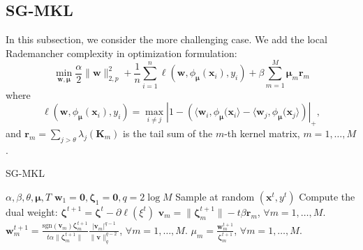 \documentclass{article}
\begin{document}
\subsection{SG-MKL}
In this subsection, we consider the more challenging case.
We add the local Rademancher complexity in optimization formulation:
\begin{equation}
\label{optimization-problem}
    \min_{\mathbf{w},\bm \mu} \frac{\alpha}{2}\|\mathbf{w}\|_{2,p}^2
    +\frac{1}{n}\sum_{i=1}^n\ell(\mathbf{w},\phi_{\bm \mu}(\mathbf{x}_i), y_i)
    +\beta\sum_{m=1}^M\mathbf{\mu}_m\mathbf{r}_m
\end{equation}
where
$$\ell(\mathbf{w},\phi_{\bm \mu}(\mathbf{x}_i), y_i)=
\max\limits_{i \not= j}\left|1-\left(\langle\mathbf{w}_i, \phi_{\bm \mu}(\mathbf{x}_i\rangle -\langle\mathbf{w}_j, \phi_{\bm \mu}(\mathbf{x}_j\rangle\right)\right|_+,$$
and
$\mathbf{r}_m=\sum_{j>\theta}\lambda_j(\mathbf{K}_m)$ is the tail sum of the $m$-th kernel matrix,  $m=1,\ldots, M$.

\begin{algorithm}[t]
   \caption{SG-MKL}
   \label{algorithm2}
    \begin{algorithmic}
        $\alpha, \beta, \theta, \mathbf{\mu}, T$
        $\mathbf{w}_1=\mathbf{0}, \mathbf{\zeta}_1=\mathbf{0},q=2\log M $
       \STATE Sample at random $(\mathbf{x}^t, y^t)$
       \STATE Compute the dual weight: $\mathbf{\zeta}^{t+1}=\mathbf{\zeta}^t-\partial{\ell(\xi^t)}$
       \STATE $\mathbf{v}_m=\|\mathbf{\zeta}_m^{t+1}\|-t\beta\mathbf{r}_m$, $\forall m=1,\ldots, M.$
       \STATE $\mathbf{w}^{t+1}_m=\frac{\text{sgn}(\mathbf{v}_m) \mathbf{\zeta}_m^{t+1}}{t\alpha\|\mathbf{\zeta}_m^{t+1}\|}
       \frac{|\mathbf{v}_m|^{q-1}}{\|\mathbf{v}\|_q^{q-2}}$, $\forall m=1,\ldots, M.$
       \STATE $\mu_m=\frac{\mathbf{w}^{t+1}_m}{\mathbf{\zeta}^{t+1}_m}$, $\forall m=1,\ldots, M.$
       \ENDFOR
    \end{algorithmic}
\end{algorithm}
\end{document}
